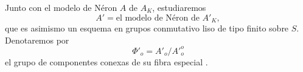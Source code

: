 Junto con el modelo de Néron $A$ de $A_K$, estudiaremos
\begin{equation}\tag{1.1.7}
 A'=\text{el modelo de Néron de }A'_K,
\end{equation}
que es asimismo un esquema en grupos conmutativo liso de tipo finito
sobre $S$. Denotaremos por
\begin{equation}\tag{1.1.8}
 \Phi'_o=A'_o/{A'}_o^o
\end{equation}
el grupo de componentes conexas de su fibra especial
.
